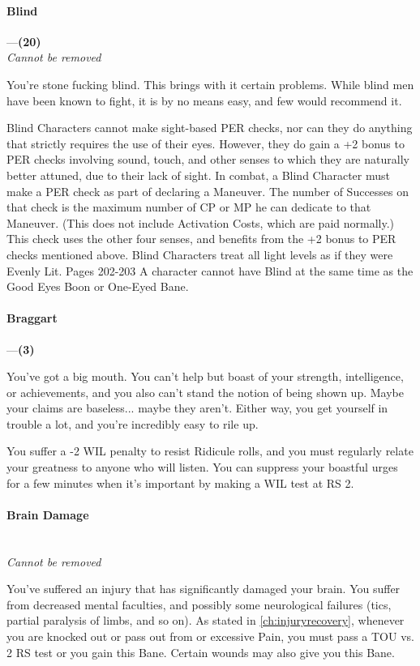 \documentclass[oneside,11pt,english]{book}
\begin{document}
\paragraph{\label{bane:Blind}Blind}---\quad\textbf{(20)}\\
\emph{Cannot be removed}\par
You're stone fucking blind. This brings with it certain problems. While blind men have been known to fight, it is by no means easy, and few would recommend it. 

Blind Characters cannot make sight-based PER checks, nor can they do anything that strictly requires the 
use of their eyes. However, they do gain a +2 bonus to PER checks involving sound, touch, and other 
senses to which they are naturally better attuned, due to their lack of sight. In combat, a Blind Character 
must make a PER check as part of declaring a Maneuver. The number of Successes on that check is the 
maximum number of CP or MP he can dedicate to that Maneuver. (This does not include Activation 
Costs, which are paid normally.) 
This check uses the other four senses, and benefits from the +2 bonus to PER checks mentioned above. 
Blind Characters treat all light levels as if they were Evenly Lit. Pages 202-203 
A character cannot have Blind at the same time as the Good Eyes Boon or One-Eyed Bane. 
\paragraph{\label{bane:Braggart}Braggart}---\quad\textbf{(3)}\par
You've got a big mouth. You can't help but boast of your strength, intelligence, or achievements, and you 
also can't stand the notion of being shown up. Maybe your claims are baseless... maybe they aren't. Either 
way, you get yourself in trouble a lot, and you're incredibly easy to rile up. 


You suffer a -2 WIL penalty to resist Ridicule rolls, and you must regularly relate your greatness to 
anyone who will listen. You can suppress your boastful urges for a few minutes when it's important by 
making a WIL test at RS 2. 

 

\paragraph{\label{bane:Brain Damage}Brain Damage}\quad\\
\textit{Cannot be removed}\par
You've suffered an injury that has significantly damaged your brain. You suffer from decreased mental 
faculties, and possibly some neurological failures (tics, partial paralysis of limbs, and so on). As stated in \autoref{ch:injuryrecovery}, whenever you are knocked out or pass out from  or excessive Pain, you must pass a TOU vs. 2 RS test or you gain this Bane. Certain wounds may also give you this Bane. 
\end{document}
